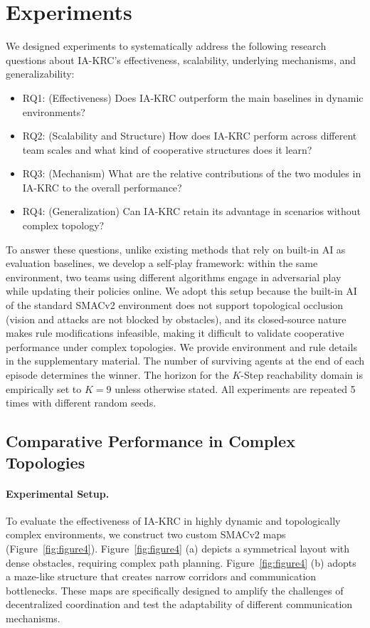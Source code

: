 \documentclass[10pt]{article} %
\begin{document}
\section{Experiments}

We designed experiments to systematically address the following research questions about IA-KRC's effectiveness, scalability, underlying mechanisms, and generalizability:
\begin{itemize}
    \item RQ1: (Effectiveness) Does IA-KRC outperform the main baselines in dynamic environments?
    \item RQ2: (Scalability and Structure) How does IA-KRC perform across different team scales and what kind of cooperative structures does it learn?
    \item RQ3: (Mechanism) What are the relative contributions of the two modules in IA-KRC to the overall performance?
    \item RQ4: (Generalization) Can IA-KRC retain its advantage in scenarios without complex topology?
\end{itemize}
To answer these questions, unlike existing methods that rely on built-in AI as evaluation baselines, we develop a self-play framework: within the same environment, two teams using different algorithms engage in adversarial play while updating their policies online. We adopt this setup because the built-in AI of the standard SMACv2 environment does not support topological occlusion (vision and attacks are not blocked by obstacles), and its closed-source nature makes rule modifications infeasible, making it difficult to validate cooperative performance under complex topologies. We provide environment and rule details in the supplementary material. The number of surviving agents at the end of each episode determines the winner. The horizon for the $K$-Step reachability domain is empirically set to $K=9$ unless otherwise stated. All experiments are repeated 5 times with different random seeds.

\subsection{Comparative Performance in Complex Topologies}
\paragraph{Experimental Setup.} 
To evaluate the effectiveness of IA-KRC in highly dynamic and topologically complex environments, we construct two custom SMACv2 maps (Figure~\ref{fig:figure4}). Figure~\ref{fig:figure4} (a) depicts a symmetrical layout with dense obstacles, requiring complex path planning. Figure~\ref{fig:figure4} (b) adopts a maze-like structure that creates narrow corridors and communication bottlenecks. These maps are specifically designed to amplify the challenges of decentralized coordination and test the adaptability of different communication mechanisms.
\end{document}
